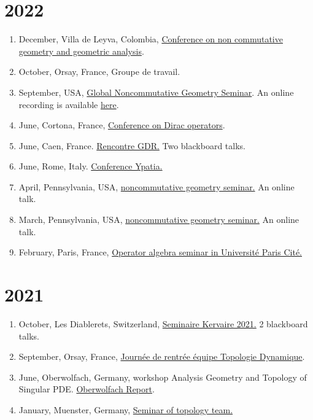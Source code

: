 \documentclass[a4paper, 13pt]{article}
\begin{document}
\section*{2022}
\begin{enumerate}
\item December, Villa de Leyva, Colombia, \href{https://villadeleyvaschool.uniandes.edu.co/}{Conference on non commutative geometry and geometric analysis}. 
\item October, Orsay, France, Groupe de travail.
\item September, USA, \href{https://globalncgseminar.org/}{Global Noncommutative Geometry Seminar}. An online recording is available \href{https://www.youtube.com/watch?v=R2KYtnaNY1c}{here}. 
\item June, Cortona, France, \href{https://cortona2022.cbaer.eu}{Conference on Dirac operators}.
\item June, Caen, France. \href{https://www.lmno.cnrs.fr/node/646}{Rencontre GDR.} Two blackboard talks.
\item June, Rome, Italy. \href{https://indico.math.cnrs.fr/event/5450/}{Conference Ypatia.}
\item April, Pennsylvania, USA, \href{}{noncommutative geometry seminar.} An online talk.
\item March, Pennsylvania, USA, \href{}{noncommutative geometry seminar.} An online talk.
\item February, Paris, France, \href{https://www.imj-prg.fr/ao/seminaires/}{Operator algebra seminar in Université Paris Cité.}
\end{enumerate}
\section*{2021}
\begin{enumerate}
\item October, Les Diablerets, Switzerland, \href{https://www5.unine.ch/diablerets2021}{Seminaire Kervaire 2021.} 2 blackboard talks.
\item September, Orsay, France, \href{https://www.imo.universite-paris-saclay.fr/fr/events/6491}{Journée de rentrée équipe Topologie Dynamique}.
\item June, Oberwolfach, Germany, workshop Analysis Geometry and Topology of Singular PDE. \href{}{Oberwolfach Report}.
\item January, Muenster, Germany, \href{https://www.uni-muenster.de/Topologie/en/researchseminars/ostopows2021-v2.html}{Seminar of topology team.}
\end{enumerate}
\end{document}
